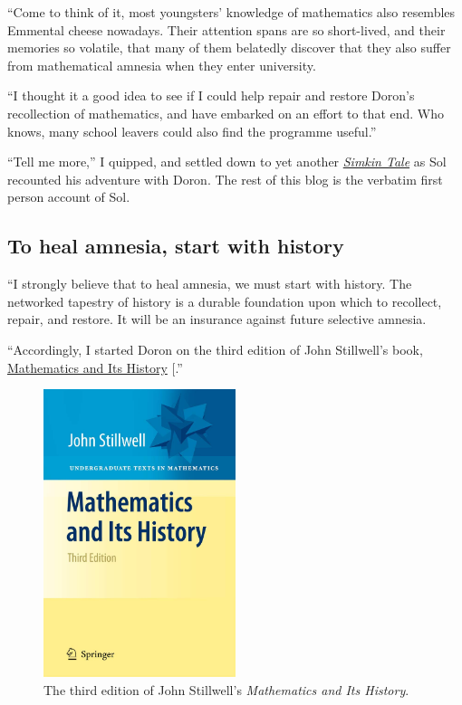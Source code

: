 \documentclass[
  a4paper,
]{article}
\begin{document}
``Come to think of it, most youngsters' knowledge of mathematics also
resembles Emmental cheese nowadays. Their attention spans are so
short-lived, and their memories so volatile, that many of them belatedly
discover that they also suffer from mathematical amnesia when they enter
university.

``I thought it a good idea to see if I could help repair and restore
Doron's recollection of mathematics, and have embarked on an effort to
that end. Who knows, many school leavers could also find the programme
useful.''

``Tell me more,'' I quipped, and settled down to yet another
\href{}{\emph{Simkin Tale}} as Sol recounted his adventure with Doron.
The rest of this blog is the verbatim first person account of Sol.

\subsection{To heal amnesia, start with
history}\label{to-heal-amnesia-start-with-history}

``I strongly believe that to heal amnesia, we must start with history.
The networked tapestry of history is a durable foundation upon which to
recollect, repair, and restore. It will be an insurance against future
selective amnesia.

``Accordingly, I started Doron on the third edition of John Stillwell's
book,
\href{https://www.amazon.in/Mathematics-Its-History-Undergraduate-Texts/dp/144196052X}{Mathematics
and Its History} {[}\citeproc{ref-stillwell2010}{1}{]}.''

\begin{figure}
\centering
\includegraphics[width=0.5\textwidth,height=\textheight]{images/stillwell-history-third.jpg}
\caption{The third edition of John Stillwell's \emph{Mathematics and Its
History}.}\label{fig:stillwell}
\end{figure}
\end{document}
